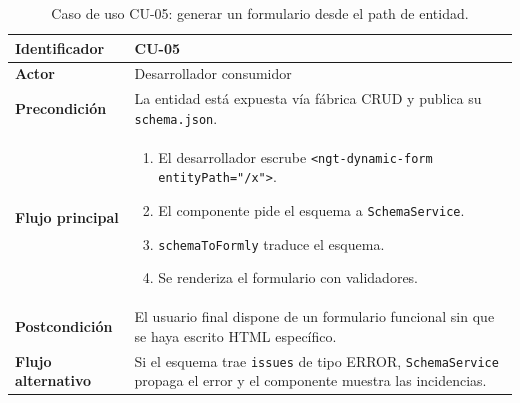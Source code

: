 \begin{table}[H]
\caption{Caso de uso CU-05: generar un formulario desde el path de entidad.}
\label{tab:cu05}
\centering
\begin{tabular}{|l|p{9cm}|}
\hline
\textbf{Identificador} & CU-05 \\ \hline
\textbf{Actor} & Desarrollador consumidor \\ \hline
\textbf{Precondición} & La entidad está expuesta vía fábrica CRUD y publica
su \texttt{schema.json}. \\ \hline
\textbf{Flujo principal} &
\begin{enumerate}
  \item El desarrollador escrube
        \texttt{<ngt-dynamic-form entityPath="/x">}.
  \item El componente pide el esquema
        a \texttt{SchemaService}.
  \item \texttt{schemaToFormly} traduce el esquema.
  \item Se renderiza el formulario con validadores.
\end{enumerate} \\ \hline
\textbf{Postcondición} & El usuario final dispone de un formulario funcional
sin que se haya escrito HTML específico. \\ \hline
\textbf{Flujo alternativo} & Si el esquema trae \texttt{issues} de tipo
ERROR, \texttt{SchemaService} propaga el error y el componente muestra las
incidencias. \\ \hline
\end{tabular}
\end{table}

